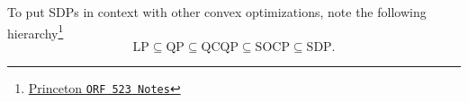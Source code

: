 \documentclass[a4paper]{article}
\begin{document}
To put SDPs in context with other convex optimizations, note the following hierarchy\footnote{\href{http://www.princeton.edu/~amirali/Public/Teaching/ORF523/S16/ORF523_S16_Lec9_gh.pdf}{Princeton \texttt{ORF 523 Notes}}}
\begin{equation*}
\text{LP}\subseteq\text{QP}\subseteq\text{QCQP}\subseteq\text{SOCP}\subseteq\text{SDP}.
\end{equation*}

\end{document}
